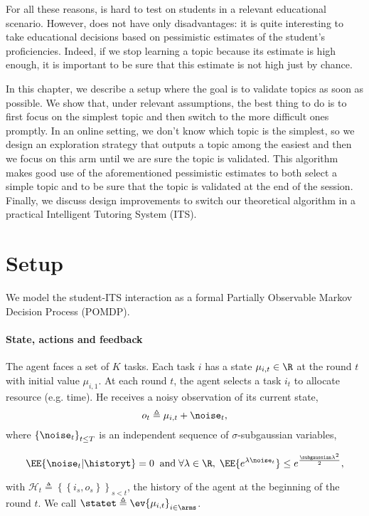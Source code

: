 For all these reasons, \RAWUCB is hard to test on students in a relevant educational scenario. However, \RAWUCB does not have only disadvantages: it is quite interesting to take educational decisions based on pessimistic estimates of the student's proficiencies. Indeed, if we stop learning a topic because its estimate is high enough, it is important to be sure that this estimate is not high just by chance. 

In this chapter, we describe a setup where the goal is to validate topics as soon as possible. We show that, under relevant assumptions, the best thing to do is to first focus on the simplest topic and then switch to the more difficult ones promptly. In an online setting, we don't know which topic is the simplest, so we design an exploration strategy that outputs a topic among the easiest and then we focus on this arm until we are sure the topic is validated. This algorithm makes good use of the aforementioned pessimistic estimates to both select a simple topic and to be sure that the topic is validated at the end of the session. Finally, we discuss design improvements to switch our theoretical algorithm in a practical Intelligent Tutoring System (ITS). 

\section{Setup}
\label{sec:setup}
We model the student-ITS interaction as a formal Partially Observable Markov Decision Process (POMDP). 
\paragraph{State, actions and feedback}
The agent faces a set of $K$ tasks. Each task $i$ has a state $\mu_{i,t}\in \R$ at the round $t$ with initial value $\mu_{i,1}$. At each round $t$, the agent selects a task $i_t$ to allocate resource (e.g. time). He receives a noisy observation of its current state,
\[ 
o_{t} \triangleq \mu_{i,t} + \noise_t,
\]
where $\left\{\noise_t\right\}_{t\leq T}$ is an independent sequence of $\sigma$-subgaussian variables, \ie

\[
\EE{ \noise_t | \historyt }= 0 \;\; \text{and} \; \forall \lambda \in \R, \; \EE{ e^{\lambda\noise_t}} \leq e^{\frac{\subgaussian\lambda^2}{2}},
\]

with $\mathcal{H}_t \triangleq \left\{ \left\{i_s,o_s   \right\}\right\}_{s < t}$, the history of the agent at the beginning of the round $t$. We call $\statet \triangleq \ev{\mu_{i,t}}_{i \in \arms}$.

